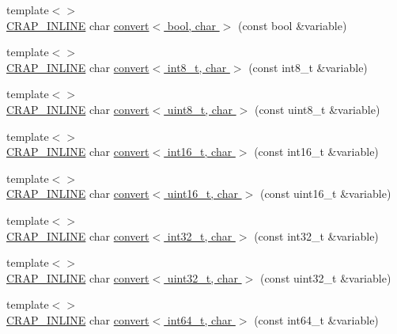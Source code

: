 \begin{DoxyCompactItemize}
\item 
{\footnotesize template$<$$>$ }\\\hyperlink{config__x86_8h_a5a40526b8d842e7ff731509998bb0f1c}{C\+R\+A\+P\+\_\+\+I\+N\+L\+I\+N\+E} char \hyperlink{namespacecrap_a8e497e8fa12071366772dd50d3db8fce}{convert$<$ bool, char $>$} (const bool \&variable)
\item 
{\footnotesize template$<$$>$ }\\\hyperlink{config__x86_8h_a5a40526b8d842e7ff731509998bb0f1c}{C\+R\+A\+P\+\_\+\+I\+N\+L\+I\+N\+E} char \hyperlink{namespacecrap_a4c78ba750ca31565138e56c7384f0b16}{convert$<$ int8\+\_\+t, char $>$} (const int8\+\_\+t \&variable)
\item 
{\footnotesize template$<$$>$ }\\\hyperlink{config__x86_8h_a5a40526b8d842e7ff731509998bb0f1c}{C\+R\+A\+P\+\_\+\+I\+N\+L\+I\+N\+E} char \hyperlink{namespacecrap_aa0bb67ceceaa770f21922bfd27395733}{convert$<$ uint8\+\_\+t, char $>$} (const uint8\+\_\+t \&variable)
\item 
{\footnotesize template$<$$>$ }\\\hyperlink{config__x86_8h_a5a40526b8d842e7ff731509998bb0f1c}{C\+R\+A\+P\+\_\+\+I\+N\+L\+I\+N\+E} char \hyperlink{namespacecrap_ab748e70e2ed8603b3316c09d6d68661a}{convert$<$ int16\+\_\+t, char $>$} (const int16\+\_\+t \&variable)
\item 
{\footnotesize template$<$$>$ }\\\hyperlink{config__x86_8h_a5a40526b8d842e7ff731509998bb0f1c}{C\+R\+A\+P\+\_\+\+I\+N\+L\+I\+N\+E} char \hyperlink{namespacecrap_a95d4413b1479c307600b18bf8db9f464}{convert$<$ uint16\+\_\+t, char $>$} (const uint16\+\_\+t \&variable)
\item 
{\footnotesize template$<$$>$ }\\\hyperlink{config__x86_8h_a5a40526b8d842e7ff731509998bb0f1c}{C\+R\+A\+P\+\_\+\+I\+N\+L\+I\+N\+E} char \hyperlink{namespacecrap_a62d4a03279f4b8d3d362a656cfa033d6}{convert$<$ int32\+\_\+t, char $>$} (const int32\+\_\+t \&variable)
\item 
{\footnotesize template$<$$>$ }\\\hyperlink{config__x86_8h_a5a40526b8d842e7ff731509998bb0f1c}{C\+R\+A\+P\+\_\+\+I\+N\+L\+I\+N\+E} char \hyperlink{namespacecrap_a4d86d0d00baf57ca438bd044822ca603}{convert$<$ uint32\+\_\+t, char $>$} (const uint32\+\_\+t \&variable)
\item 
{\footnotesize template$<$$>$ }\\\hyperlink{config__x86_8h_a5a40526b8d842e7ff731509998bb0f1c}{C\+R\+A\+P\+\_\+\+I\+N\+L\+I\+N\+E} char \hyperlink{namespacecrap_a89adf884d344cf15d3dd055dec226f2b}{convert$<$ int64\+\_\+t, char $>$} (const int64\+\_\+t \&variable)

\end{DoxyCompactItemize}
